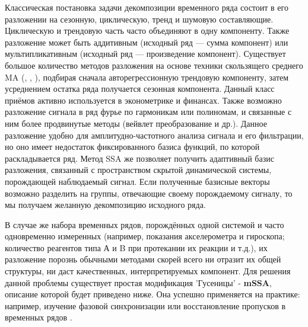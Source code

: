 		Классическая постановка задачи декомпозиции временного ряда состоит в его разложении на сезонную, циклическую, тренд и шумовую составляющие. Циклическую и трендовую часть часто объединяют в одну компоненту. Также разложение может быть аддитивным (исходный ряд --- сумма компонент) или мультипликативным (исходный ряд --- произведение компонент). Существует большое количество методов разложения на основе техники скользящего среднего MA (\cite{enders2010applied}, \cite{x11}, \cite{cleveland90}), подбирая сначала авторегрессионную трендовую компоненту, затем усреднением остатка ряда получается сезонная компонента. Данный класс приёмов активно используется в эконометрике и финансах. Также возможно разложение сигнала в ряд фурье по гармоникам или полиномам, и связанные с ним более продвинутые методы (вейвлет преобразование и др.). Данное разложение удобно для амплитудно-частотного анализа сигнала и его фильтрации, но оно имеет недостаток фиксированного базиса функций, по которой раскладывается ряд. Метод SSA же позволяет получить адаптивный базис разложения, связанный с пространством скрытой динамической системы, порождающей наблюдаемый сигнал. Если полученные базисные векторы возможно разделить на группы, отвечающие своему порождаемому сигналу, то мы получаем желанную декомпозицию исходного ряда.
		
		В случае же набора временных рядов, порождённых одной системой и часто одновременно измеренных (например, показания акселерометра и гироскопа; количество реагентов типа А и B при протекании их реакции и т.д.), их разложение порознь обычными методами скорей всего ни отразит их общей структуры, ни даст качественных, интерпретируемых компонент. Для решения данной проблемы существует простая модификация 'Гусеницы' - \textbf{mSSA}, описание которой будет приведено ниже. Она успешно применяется на практике: например, изучение фазовой синхронизации \cite{PhysRevE.84.036206} или восстановление пропусков в временных рядов \cite{agarwal2020multivariate}.
		

